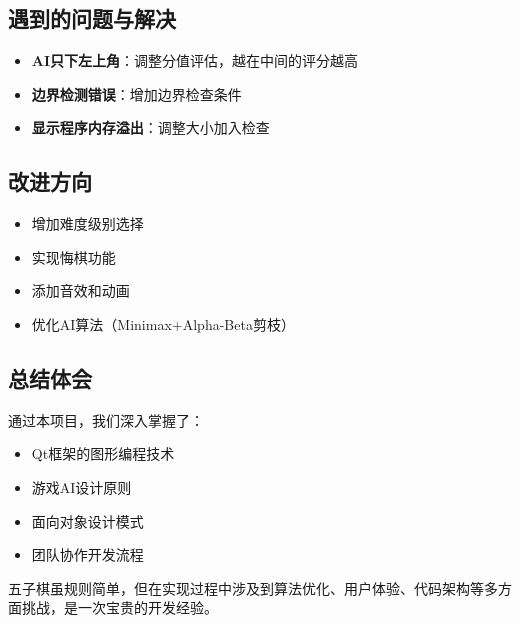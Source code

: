 \documentclass[UTF8]{ctexart}
\begin{document}
\subsection{遇到的问题与解决}
\begin{itemize}
    \item \textbf{AI只下左上角}：调整分值评估，越在中间的评分越高
    \item \textbf{边界检测错误}：增加边界检查条件
    \item \textbf{显示程序内存溢出}：调整大小加入检查
\end{itemize}

\subsection{改进方向}
\begin{itemize}
    \item 增加难度级别选择
    \item 实现悔棋功能
    \item 添加音效和动画
    \item 优化AI算法（Minimax+Alpha-Beta剪枝）
\end{itemize}

\subsection{总结体会}
通过本项目，我们深入掌握了：
\begin{itemize}
    \item Qt框架的图形编程技术
    \item 游戏AI设计原则
    \item 面向对象设计模式
    \item 团队协作开发流程
\end{itemize}
五子棋虽规则简单，但在实现过程中涉及到算法优化、用户体验、代码架构等多方面挑战，是一次宝贵的开发经验。
\end{document}
